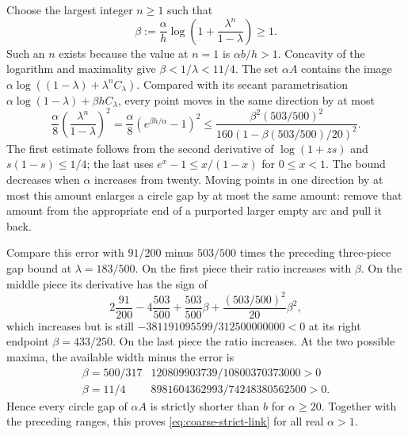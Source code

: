 Choose the largest integer $n\ge1$ such that
\[
 \beta:=\frac{\alpha}{h}
       \log\left(1+\frac{\lambda^n}{1-\lambda}\right)\ge1.
\]
Such an $n$ exists because the value at $n=1$ is $\alpha b/h>1$.
Concavity of the logarithm and maximality give $\beta<1/\lambda<11/4$.
The set $\alpha A$ contains the image
$\alpha\log((1-\lambda)+\lambda^n C_\lambda)$.
Compared with its secant parametrisation
$\alpha\log(1-\lambda)+\beta h C_\lambda$, every point moves in the same
direction by at most
\[
 \frac\alpha8\left(\frac{\lambda^n}{1-\lambda}\right)^2
 =\frac\alpha8(e^{\beta h/\alpha}-1)^2
 \le\frac{\beta^2(503/500)^2}
 {160(1-\beta(503/500)/20)^2}.
\]
The first estimate follows from the second derivative of $\log(1+zs)$
and $s(1-s)\le1/4$; the last uses $e^x-1\le x/(1-x)$ for $0\le x<1$.
The bound decreases when $\alpha$ increases from twenty.
Moving points in one direction by at most this amount enlarges a circle
gap by at most the same amount: remove that amount from the appropriate
end of a purported larger empty arc and pull it back.

Compare this error with $91/200$ minus $503/500$ times the preceding
three-piece gap bound at $\lambda=183/500$.
On the first piece their ratio increases with $\beta$.
On the middle piece its derivative has the sign of
\[
 2\frac{91}{200}-4\frac{503}{500}
 +\frac{503}{500}\beta+\frac{(503/500)^2}{20}\beta^2,
\]
which increases but is still
$-381191095599/312500000000<0$ at its right endpoint $\beta=433/250$.
On the last piece the ratio increases.
At the two possible maxima, the available width minus the error is
\[
 \begin{array}{c|c}
 \beta=500/317&120809903739/10800370373000>0\\
 \beta=11/4&8981604362993/74248380562500>0.
 \end{array}
\]
Hence every circle gap of $\alpha A$ is strictly shorter than $b$ for
$\alpha\ge20$. Together with the preceding ranges, this proves
\eqref{eq:coarse-strict-link} for all real $\alpha>1$.

